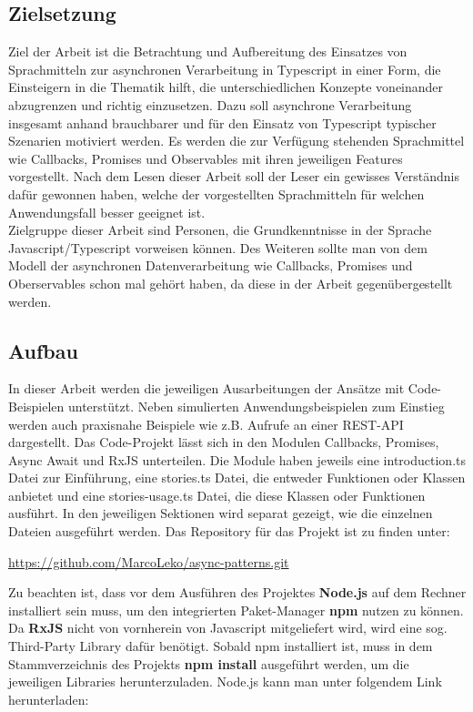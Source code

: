 \subsection{Zielsetzung}

Ziel der Arbeit ist die Betrachtung und Aufbereitung des Einsatzes von Sprachmitteln zur asynchronen Verarbeitung in Typescript in einer Form, die Einsteigern in die Thematik hilft, die unterschiedlichen Konzepte voneinander abzugrenzen und richtig einzusetzen. Dazu soll asynchrone Verarbeitung insgesamt anhand brauchbarer und für den Einsatz von Typescript typischer Szenarien motiviert werden. Es werden die zur Verfügung stehenden Sprachmittel wie Callbacks, Promises und Observables mit ihren jeweiligen Features vorgestellt. Nach dem Lesen dieser Arbeit soll der Leser ein gewisses Verständnis dafür gewonnen haben, welche der vorgestellten Sprachmitteln für welchen Anwendungsfall besser geeignet ist.\\

\noindent
Zielgruppe dieser Arbeit sind Personen, die Grundkenntnisse in der Sprache Javascript/Typescript vorweisen können. Des Weiteren sollte man von dem Modell der asynchronen Datenverarbeitung wie Callbacks, Promises und Oberservables schon mal gehört haben, da diese in der Arbeit gegenübergestellt werden.

\subsection{Aufbau}

In dieser Arbeit werden die jeweiligen Ausarbeitungen der Ansätze mit Code-Beispielen unterstützt. Neben simulierten Anwendungsbeispielen zum Einstieg werden auch praxisnahe Beispiele wie z.B. Aufrufe an einer REST-API dargestellt. Das Code-Projekt lässt sich in den Modulen Callbacks, Promises, Async Await und RxJS unterteilen. Die Module haben jeweils eine introduction.ts Datei zur Einführung, eine stories.ts Datei, die entweder Funktionen oder Klassen anbietet und eine stories-usage.ts Datei, die diese Klassen oder Funktionen ausführt. In den jeweiligen Sektionen wird separat gezeigt, wie die einzelnen Dateien ausgeführt werden. Das Repository für das Projekt ist zu finden unter: 

\begin{center}
\url{https://github.com/MarcoLeko/async-patterns.git}
\end{center}

\noindent
Zu beachten ist, dass vor dem Ausführen des Projektes \textbf{Node.js} auf dem Rechner installiert sein muss, um den integrierten Paket-Manager \textbf{npm} nutzen zu können. Da \textbf{RxJS} nicht von vornherein von Javascript mitgeliefert wird, wird eine sog. \glqq Third-Party Library\grqq{} dafür benötigt. Sobald npm installiert ist, muss in dem Stammverzeichnis des Projekts \textbf{npm install} ausgeführt werden, um die jeweiligen Libraries herunterzuladen. Node.js kann man unter folgendem Link herunterladen:

